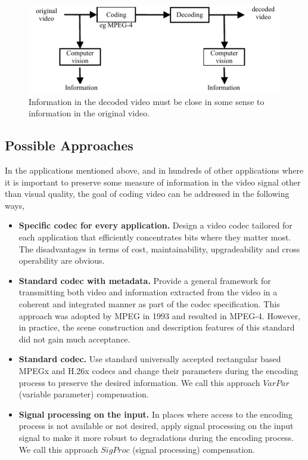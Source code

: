 \documentclass{article}
\begin{document}
			\begin{figure}				
					\includegraphics[width=.45\textwidth]{figs/TRK_IPCV2009_BlockDiagram_1}
					\caption{Information in the decoded video must be close in some sense to information in the original video.}
					\label{fig:ProblemStatement}
			\end{figure}

\subsection{Possible Approaches}
In the applications mentioned above, and in hundreds of other applications where it is important to preserve some measure of information in the video signal other than visual quality, the goal of coding video can be addressed in the following ways,

\begin{itemize}

\item \textbf{Specific codec for every application.} Design a video codec tailored for each application that efficiently concentrates bits where they matter most.  The disadvantages in terms of cost, maintainability, upgradeability and cross operability are obvious.

\item \textbf{Standard codec with metadata.}  Provide a general framework for transmitting both video and information extracted from the video in a coherent and integrated manner as part of the codec specification.  This approach was adopted by MPEG in 1993 and resulted in MPEG-4.  However, in practice, the scene construction and description features of this standard did not gain much acceptance.

\item \textbf{Standard codec.}  Use standard universally accepted rectangular based MPEGx and H.26x codecs and change their parameters during the encoding process to preserve the desired information.  We call this approach $VarPar$ (variable parameter) compensation.

\item \textbf{Signal processing on the input.}  In places where access to the encoding process is not available or not desired, apply signal processing on the input signal to make it more robust to degradations during the encoding process.  We call this approach $SigProc$ (signal processing) compensation.

\end{itemize}
\end{document}

